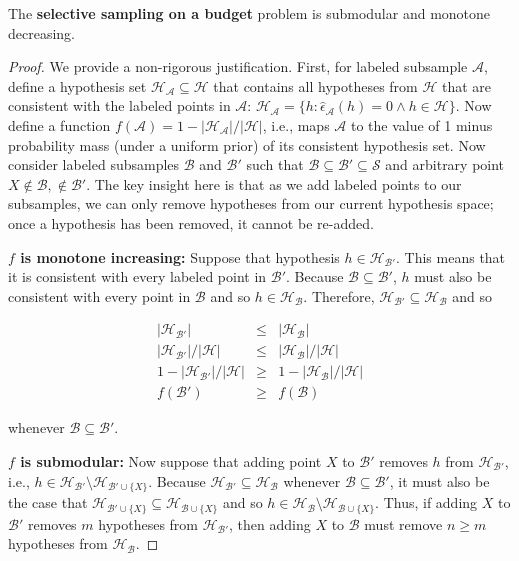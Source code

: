 \begin{lemma}
\label{lma:ss}
The \textbf{selective sampling on a budget} problem is submodular and monotone decreasing.
\end{lemma}
\begin{proof}
We provide a non-rigorous justification. First, for labeled subsample $\mathcal{A}$, define a hypothesis set $\mathcal{H}_{\mathcal{A}} \subseteq \mathcal{H}$ that contains all hypotheses from $\mathcal{H}$ that are consistent with the labeled points in $\mathcal{A}$: $\mathcal{H}_{\mathcal{A}} = \{h : \hat{\epsilon}_{\mathcal{A}}(h)=0 \wedge h \in \mathcal{H}\}$. Now define a function $f(\mathcal{A}) = 1-|\mathcal{H}_{\mathcal{A}}| / |\mathcal{H}|$, i.e., maps $\mathcal{A}$ to the value of 1 minus probability mass (under a uniform prior) of its consistent hypothesis set. Now consider labeled subsamples $\mathcal{B}$ and $\mathcal{B}'$ such that $\mathcal{B} \subseteq \mathcal{B}' \subseteq \mathcal{S}$ and arbitrary point $X \not\in \mathcal{B}, \not\in \mathcal{B}'$. The key insight here is that as we add labeled points to our subsamples, we can only remove hypotheses from our current hypothesis space; once a hypothesis has been removed, it cannot be re-added.

\textbf{$f$ is monotone increasing:} Suppose that hypothesis $h \in \mathcal{H}_{\mathcal{B}'}$. This means that it is consistent with every labeled point in $\mathcal{B}'$. Because $\mathcal{B} \subseteq \mathcal{B}'$, $h$ must also be consistent with every point in $\mathcal{B}$ and so $h \in \mathcal{H}_{\mathcal{B}}$. Therefore, $\mathcal{H}_{\mathcal{B}'} \subseteq \mathcal{H}_{\mathcal{B}}$ and so

\begin{eqnarray*}
|\mathcal{H}_{\mathcal{B}'}| &\leq& |\mathcal{H}_{\mathcal{B}}| \\
|\mathcal{H}_{\mathcal{B}'}| / |\mathcal{H}| &\leq& |\mathcal{H}_{\mathcal{B}}| / |\mathcal{H}| \\
1-|\mathcal{H}_{\mathcal{B}'}| / |\mathcal{H}| &\geq& 1-|\mathcal{H}_{\mathcal{B}}| / |\mathcal{H}| \\
f(\mathcal{B}') &\geq& f(\mathcal{B})
\end{eqnarray*}

\noindent whenever $\mathcal{B} \subseteq \mathcal{B}'$.

\textbf{$f$ is submodular:} Now suppose that adding point $X$ to $\mathcal{B}'$ removes $h$ from $\mathcal{H}_{\mathcal{B}'}$, i.e., $h \in \mathcal{H}_{\mathcal{B}'} \setminus \mathcal{H}_{\mathcal{B}' \cup \{X\}}$. Because $\mathcal{H}_{\mathcal{B}'} \subseteq \mathcal{H}_{\mathcal{B}}$ whenever $\mathcal{B} \subseteq \mathcal{B}'$, it must also be the case that $\mathcal{H}_{\mathcal{B}' \cup \{X\}} \subseteq \mathcal{H}_{\mathcal{B} \cup \{X\}}$ and so $h \in \mathcal{H}_{\mathcal{B}} \setminus \mathcal{H}_{\mathcal{B} \cup \{X\}}$. Thus, if adding $X$ to $\mathcal{B}'$ removes $m$ hypotheses from $\mathcal{H}_{\mathcal{B}'}$, then adding $X$ to $\mathcal{B}$ must remove $n \geq m$ hypotheses from $\mathcal{H}_{\mathcal{B}}$.


\end{proof}
